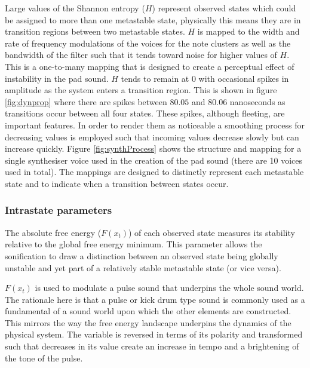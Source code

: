 \documentclass[a4paper,10pt,oneside]{article}
\begin{document}
\begin{sloppy}
Large values of the Shannon entropy ($H$) represent observed states which could be assigned to more than one metastable state, physically this means they are in transition regions between two metastable states. $H$ is mapped to the width and rate of frequency modulations of the voices for the note clusters as well as the bandwidth of the filter such that it tends toward noise for higher values of $H$. This is a one-to-many mapping that is designed to create a perceptual effect of instability in the pad sound. $H$ tends to remain at $0$ with occasional spikes in amplitude as the system enters a transition region. This is shown in figure \ref{fig:dynprop} where there are spikes between $80.05$ and $80.06$ nanoseconds as transitions occur between all four states. These spikes, although fleeting, are important features. In order to render them as noticeable a smoothing process for decreasing values is employed such that incoming values decrease slowly but can increase quickly. Figure \ref{fig:synthProcess} shows the structure and mapping for a single synthesiser voice used in the creation of the pad sound (there are 10 voices used in total). The mappings are designed to distinctly represent each metastable state and to indicate when a transition between states occur.

\subsubsection{Intrastate parameters}
The absolute free energy ($F(x_t)$) of each observed state measures its stability relative to the global free energy minimum. This parameter allows the sonification to draw a distinction between an observed state being globally unstable and yet part of a relatively stable metastable state (or vice versa). 

$F(x_t)$ is used to modulate a pulse sound that underpins the whole sound world. The rationale here is that a pulse or kick drum type sound is commonly used as a fundamental of a sound world upon which the other elements are constructed. This mirrors the way the free energy landscape underpins the dynamics of the physical system. The variable is reversed in terms of its polarity and transformed such that decreases in its value create an increase in tempo and a brightening of the tone of the pulse. 


\end{sloppy}
\end{document}
